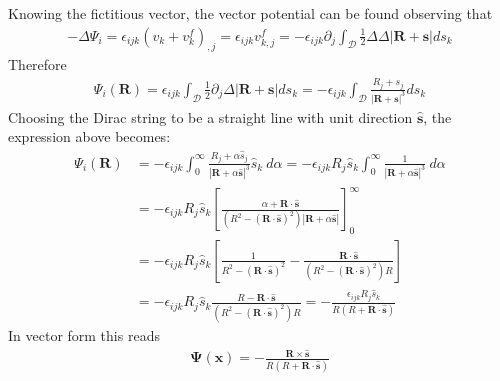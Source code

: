 Knowing the fictitious vector, the vector potential can be found observing that \[ \begin{align} -\Delta \Psi_i=\epsilon_{ijk}(v_k+v^f_k)_{,j}=\epsilon_{ijk}v^f_{k,j}=-\epsilon_{ijk}\partial_j\int_\mathcal{D}\frac{1}{2}\Delta\Delta |\mathbf{R}+\mathbf{s}|ds_k \end{align} \] Therefore \[ \begin{align} \Psi_i(\mathbf R)=\epsilon_{ijk}\int_\mathcal{D}\frac{1}{2}\partial_j\Delta |\mathbf{R}+\mathbf{s}|ds_k=-\epsilon_{ijk}\int_\mathcal{D}\frac{R_j+s_j}{|\mathbf{R}+\mathbf{s}|^3}ds_k \end{align} \] Choosing the Dirac string to be a straight line with unit direction $\hat{\mathbf{s}}$, the expression above becomes\+: \[ \begin{align} \Psi_i(\mathbf R)& =-\epsilon_{ijk}\int_0^\infty\frac{R_j+\alpha \hat{s}_j}{|\mathbf{R}+\alpha\hat{\mathbf{s}}|^3}\hat{s}_k\ d\alpha =-\epsilon_{ijk}R_j\hat{s}_k\int_0^\infty\frac{1}{|\mathbf{R}+\alpha\hat{\mathbf{s}}|^3}\ d\alpha\nonumber\\ &=-\epsilon_{ijk}R_j\hat{s}_k\left[\frac{\alpha+\mathbf{R}\cdot\hat{\mathbf{s}}}{\left(R^2-(\mathbf{R}\cdot\hat{\mathbf{s}})^2\right)|\mathbf R+\alpha\hat{\mathbf s}|}\right]_0^\infty\nonumber\\ &=-\epsilon_{ijk}R_j\hat{s}_k\left[\frac{1}{R^2-(\mathbf{R}\cdot\hat{\mathbf{s}})^2} -\frac{\mathbf{R}\cdot\hat{\mathbf{s}}}{\left(R^2-(\mathbf{R}\cdot\hat{\mathbf{s}})^2\right)R}\right]\nonumber\\ &=-\epsilon_{ijk}R_j\hat{s}_k \frac{R-\mathbf{R}\cdot\hat{\mathbf{s}}}{\left(R^2-(\mathbf{R}\cdot\hat{\mathbf{s}})^2\right)R} =-\frac{\epsilon_{ijk}R_j\hat{s}_k}{R\left(R+\mathbf{R}\cdot\hat{\mathbf{s}}\right)} \end{align} \] In vector form this reads \[ \begin{align} \mathbf{\Psi}(\mathbf{x})=-\frac{\mathbf{R}\times\hat{\mathbf{s}}}{R\left(R+\mathbf{R}\cdot\hat{\mathbf{s}}\right)} \end{align} \]

